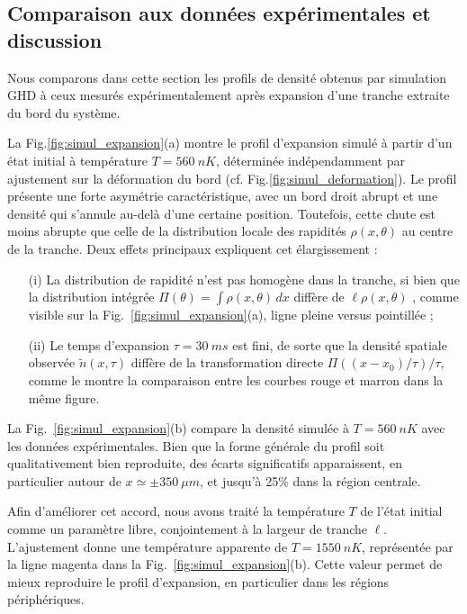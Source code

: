 \subsection{Comparaison aux données expérimentales et discussion}

Nous comparons dans cette section les profils de densité obtenus par simulation GHD à ceux mesurés expérimentalement après expansion d’une tranche extraite du bord du système.

\medskip

La Fig.\ref{fig:simul_expansion}(a) montre le profil d’expansion simulé à partir d’un état initial à température $T = 560~nK$, déterminée indépendamment par ajustement sur la déformation du bord (cf. Fig.\ref{fig:simul_deformation}). Le profil présente une forte asymétrie caractéristique, avec un bord droit abrupt et une densité qui s'annule au-delà d’une certaine position. Toutefois, cette chute est moins abrupte que celle de la distribution locale des rapidités $\rho(x, \theta)$ au centre de la tranche. Deux effets principaux expliquent cet élargissement :
\begin{itemize}
	\item[(i)] La distribution de rapidité n’est pas homogène dans la tranche, si bien que la distribution intégrée $\Pi(\theta) = \int \rho(x,\theta) \, dx $  diffère de $\ell \rho(x , \theta )$ , comme visible sur la Fig.~\ref{fig:simul_expansion}(a), ligne pleine versus pointillée ;
	\item[(ii)] Le temps d’expansion $\tau =30~ ms$ est fini, de sorte que la densité spatiale observée $\tilde{n}(x , \tau )$ diffère de la transformation directe $\Pi( (x-x_0)/\tau) /\tau $, comme le montre la comparaison entre les courbes rouge et marron dans la même figure.
\end{itemize}

\medskip

La Fig.~\ref{fig:simul_expansion}(b) compare la densité simulée à $T=560~nK$ avec les données expérimentales. Bien que la forme générale du profil soit qualitativement bien reproduite, des écarts significatifs apparaissent, en particulier autour de $x \simeq \pm 350 ~\mu m$, et jusqu’à 25$\%$ dans la région centrale.

\medskip

Afin d’améliorer cet accord, nous avons traité la température $T$ de l’état initial comme un paramètre libre, conjointement à la largeur de tranche $\ell$. L’ajustement donne une température apparente de $T=1550~nK$, représentée par la ligne magenta dans la Fig.~\ref{fig:simul_expansion}(b). Cette valeur permet de mieux reproduire le profil d’expansion, en particulier dans les régions périphériques.

